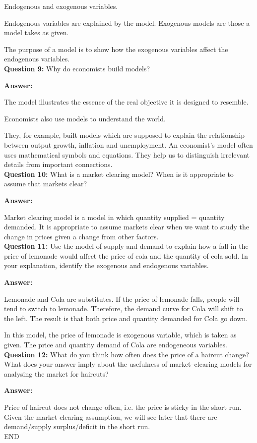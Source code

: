 \documentclass[a4paper, 11pt]{article}
\begin{document}
Endogenous and exogenous variables.

Endogenous variables are explained by the model. Exogenous models are those a model takes as given.

The purpose of a model is to show how the exogenous variables affect the endogenous variables. \\

\textbf{Question 9:} Why do economists build models? 

\textbf{Answer:} 

The model illustrates the essence of the real objective it is designed to resemble.

Economists also use models to understand the world.

They, for example, built models which are supposed to explain the relationship between output growth, inflation and unemployment. An economist’s model often uses mathematical symbols and equations. They help us to distinguish irrelevant details from important connections. \\

\textbf{Question 10:} What is a market clearing model? When is it appropriate to assume that markets clear? 

\textbf{Answer:} 

Market clearing model is a model in which quantity supplied = quantity demanded. It is appropriate to assume markets clear when we want to study the change in prices given a change from other factors. \\

\textbf{Question 11:} Use the model of supply and demand to explain how a fall in the price of lemonade would affect the price of cola and the quantity of cola sold. In your explanation, identify the exogenous and endogenous variables. 

\textbf{Answer:} 

Lemonade and Cola are substitutes. If the price of lemonade falls, people will tend to switch to lemonade. Therefore, the demand curve for Cola will shift to the left. The result is that both price and quantity demanded for Cola go down.

In this model, the price of lemonade is exogenous variable, which is taken as given. The price and quantity demand of Cola are endogeneous variables. \\

\textbf{Question 12:} What do you think how often does the price of a haircut change? What does your answer imply about the usefulness of market--clearing models for analysing the market for haircuts? 

\textbf{Answer:} 

Price of haircut does not change often, i.e. the price is sticky in the short run. Given the market clearing assumption, we will see later that there are demand/supply surplus/deficit in the short run. \\

\centering
END
\end{document}
